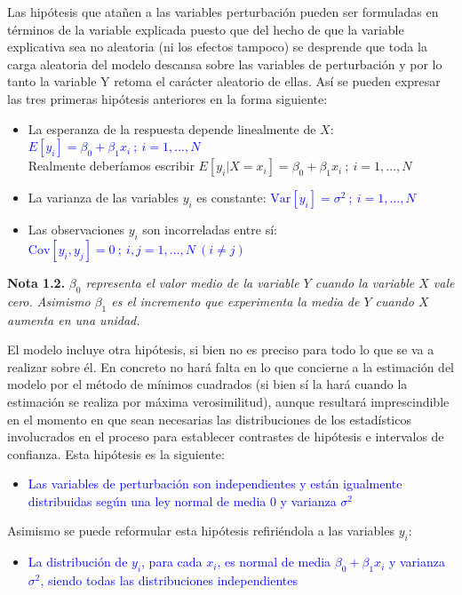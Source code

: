 \documentclass[10pt,a4paper]{book}
\begin{document}
Las hipótesis que atañen a las variables perturbación pueden ser formuladas en términos de la variable explicada puesto que del hecho de que la variable explicativa sea no aleatoria (ni los efectos tampoco) se desprende que toda la carga aleatoria del modelo descansa sobre las variables de perturbación y por lo tanto la variable Y retoma el carácter aleatorio de ellas. Así se pueden expresar las tres primeras hipótesis anteriores en la forma siguiente:
\begin{itemize}
\item La esperanza de la respuesta depende linealmente de $X$: \textcolor{blue}{$E[y_i]=\beta_0 + \beta_1x_i\ ;\ i=1,...,N$}\\
{\scriptsize Realmente deberíamos escribir $E[y_i | X=x_i]=\beta_0 + \beta_1x_i\ ;\ i=1,...,N$}
\item La varianza de las variables $y_i$ es constante: \textcolor{blue}{$\mathrm{Var}[y_i]=\sigma^2\ ;\ i=1,...,N$}
\item Las observaciones $y_i$ son incorreladas entre sí: \textcolor{blue}{$\mathrm{Cov}[y_i,y_j]=0\ ;\ i,j=1,...,N\ (i \neq j)$}
\end{itemize}

\textbf{Nota 1.2.} \textit{$\beta_0$ representa el valor medio de la variable $Y$ cuando la variable $X$ vale cero. Asimismo $\beta_1$ es el incremento que experimenta la media de $Y$ cuando $X$ aumenta en una unidad.}

El modelo incluye otra hipótesis, si bien no es preciso para todo lo que se va a realizar sobre él. En concreto no hará falta en lo que concierne a la estimación del modelo por el método de mínimos cuadrados (si bien sí la hará cuando la estimación se realiza por máxima verosimilitud), aunque resultará imprescindible en el momento en que sean necesarias las distribuciones de los estadísticos involucrados en el proceso para establecer contrastes de hipótesis e intervalos de confianza. Esta hipótesis es la siguiente:
\begin{itemize}
\item \textcolor{blue}{Las variables de perturbación son independientes y están igualmente distribuidas según una ley normal de media 0 y varianza $\sigma^2$}
\end{itemize}

Asimismo se puede reformular esta hipótesis refiriéndola a las variables $y_i$:
\begin{itemize}
\item \textcolor{blue}{La distribución de $y_i$, para cada $x_i$, es normal de media $\beta_0 + \beta_1x_i$ y varianza $\sigma^2$, siendo todas las distribuciones independientes}
\end{itemize}
\end{document}
